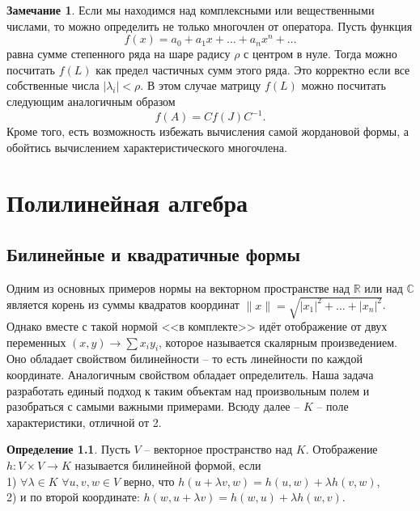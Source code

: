 \documentclass[10pt,a4paper,oneside]{book} %
\theoremstyle{definition}
\newtheorem*{rem}{Замечание}
\newtheorem*{defn}{Определение}
\newcommand{\mb}[1]{\mathbb{#1}}
\def\dfn{\begin{defn}}
\def\edfn{\end{defn}}
\def\rm{\begin{rem}}
\def\erm{\end{rem}}
\begin{document}
\rm Если мы находимся над комплексными или вещественными числами, то можно определить не только многочлен от оператора. Пусть функция $$f(x)=a_0 +a_1 x+ \dots + a_n x^n + \dots$$ равна сумме степенного ряда на шаре радису $\rho$ с центром в нуле. Тогда можно посчитать $f(L)$ как предел частичных сумм этого ряда. Это корректно если все собственные числа $|\lambda_i|< \rho$. В этом случае матрицу $f(L)$ можно посчитать следующим аналогичным образом
$$f(A)= C f(J) C^{-1}.$$
Кроме того, есть возможность избежать вычисления самой жордановой формы, а обойтись вычислением характеристического многочлена.
\erm





\chapter{Полилинейная алгебра}

\section{Билинейные и квадратичные формы}

Одним из основных примеров нормы на векторном пространстве над $\mb R$ или над $\mb C$ является корень из суммы квадратов координат $\|x\|=\sqrt{|x_1|^2+\dots +|x_n|^2}$. Однако вместе с такой нормой <<в комплекте>> идёт отображение от двух переменных $(x,y) \to \sum x_iy_i$, которое называется скалярным произведением. Оно обладает свойством билинейности -- то есть линейности по каждой координате. Аналогичным свойством обладает определитель. Наша задача разработать единый подход к таким объектам над произвольным полем и разобраться с самыми важными примерами.  
Всюду далее -- $K$ -- поле характеристики, отличной от 2.

\dfn Пусть $V$ -- векторное пространство над $K$. Отображение $h\colon V\times V \to K$ называется билинейной формой, если\\
1) $\forall \lambda \in K$ $\forall u,v,w \in V$ верно, что $h(u+\lambda v, w) = h(u,w)+\lambda h(v,w)$,\\
2) и по второй координате: $h( w, u+\lambda v) = h(w,u)+\lambda h(w,v)$.
\edfn
\end{document}
